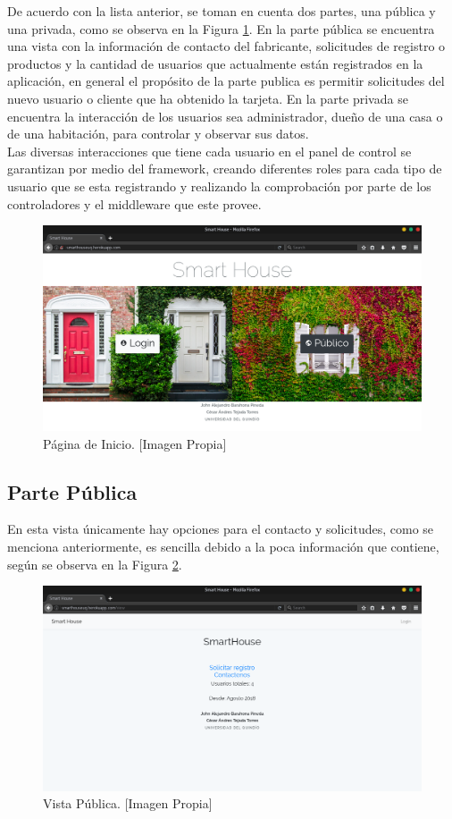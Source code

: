 De acuerdo con la lista anterior, se toman en cuenta dos partes, una pública y una privada, como se observa en la Figura \ref{fig:index}. En la parte pública se encuentra una vista con la información de contacto del fabricante, solicitudes de registro o productos y la cantidad de usuarios que actualmente están registrados en la aplicación, en general el propósito de la parte publica es permitir solicitudes del nuevo usuario o cliente que ha obtenido la tarjeta. En la parte privada se encuentra la interacción de los usuarios sea administrador, dueño de una casa o de una habitación, para controlar y observar sus datos.\\

Las diversas interacciones que tiene cada usuario en el panel de control se garantizan por medio del framework, creando diferentes roles para cada tipo de usuario que se esta registrando y realizando la comprobación por parte de los controladores y el middleware que este provee.\\

\begin{figure}[H]
\centering
\caption{Página de Inicio. [Imagen Propia]}
\label{fig:index}
\includegraphics[width=0.5\linewidth]{Imagenes/Index}
\end{figure}

\subsection{Parte Pública}

En esta vista únicamente hay opciones para el contacto y solicitudes, como se menciona anteriormente, es sencilla debido a la poca información que contiene, según se observa en la Figura \ref{fig:publicview}.

\begin{figure}[H]
\centering
\caption{Vista Pública. [Imagen Propia]}
\label{fig:publicview}
\includegraphics[width=0.5\linewidth]{Imagenes/Public_view}
\end{figure}

